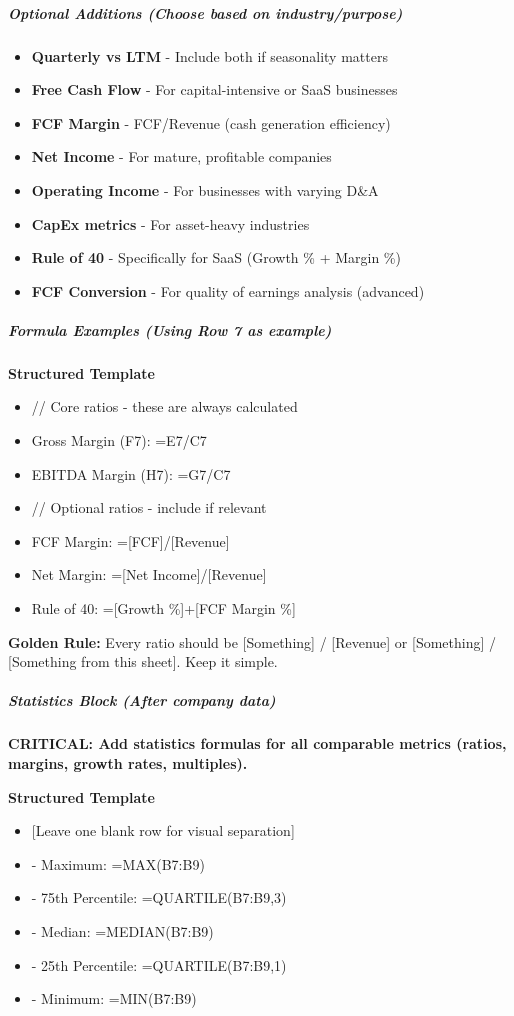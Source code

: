 \documentclass[11pt]{article}
\begin{document}
\subparagraph{Optional Additions (Choose based on industry/purpose)}\mbox{}\par
\begin{itemize}[leftmargin=*,itemsep=2pt,topsep=2pt]
\item {} \textbf{Quarterly vs LTM} - Include both if seasonality matters
\item {} \textbf{Free Cash Flow} - For capital-intensive or SaaS businesses
\item {} \textbf{FCF Margin} - FCF/Revenue (cash generation efficiency)
\item {} \textbf{Net Income} - For mature, profitable companies
\item {} \textbf{Operating Income} - For businesses with varying D\&A
\item {} \textbf{CapEx metrics} - For asset-heavy industries
\item {} \textbf{Rule of 40} - Specifically for SaaS (Growth \% + Margin \%)
\item {} \textbf{FCF Conversion} - For quality of earnings analysis (advanced)
\end{itemize}

\subparagraph{Formula Examples (Using Row 7 as example)}\mbox{}\par
\textbf{Structured Template}
\begin{itemize}[leftmargin=*,itemsep=2pt,topsep=2pt]
\item {} // Core ratios - these are always calculated
\item {} Gross Margin (F7): =E7/C7
\item {} EBITDA Margin (H7): =G7/C7
\item {} // Optional ratios - include if relevant
\item {} FCF Margin: =[FCF]/[Revenue]
\item {} Net Margin: =[Net Income]/[Revenue]
\item {} Rule of 40: =[Growth \%]+[FCF Margin \%]
\end{itemize}

\textbf{Golden Rule:} Every ratio should be [Something] / [Revenue] or [Something] / [Something from this sheet]. Keep it simple.


\subparagraph{Statistics Block (After company data)}\mbox{}\par

\textbf{CRITICAL: Add statistics formulas for all comparable metrics (ratios, margins, growth rates, multiples).}


\textbf{Structured Template}
\begin{itemize}[leftmargin=*,itemsep=2pt,topsep=2pt]
\item {} [Leave one blank row for visual separation]
\item {} - Maximum: =MAX(B7:B9)
\item {} - 75th Percentile: =QUARTILE(B7:B9,3)
\item {} - Median: =MEDIAN(B7:B9)
\item {} - 25th Percentile: =QUARTILE(B7:B9,1)
\item {} - Minimum: =MIN(B7:B9)
\end{itemize}
\end{document}
